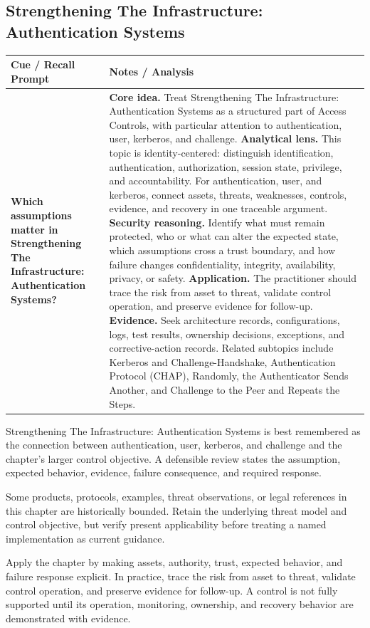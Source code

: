 \documentclass[11pt]{article}
\newcommand{\CornellHeader}{%
\rowcolor{Navy}\color{white}\bfseries Cue / Recall Prompt & \color{white}\bfseries Notes / Analysis\\\hline}
\newcommand{\CornellRow}[2]{%
\cellcolor{CueGray}\RaggedRight\textbf{#1} & \RaggedRight #2\\\hline}
\begin{document}
\subsection*{Strengthening The Infrastructure: Authentication Systems}
\begin{longtable}{>{\RaggedRight\arraybackslash}p{}|>{\RaggedRight\arraybackslash}p{}}
\CornellHeader
\CornellRow{Which assumptions matter in Strengthening The Infrastructure: Authentication Systems?}{\textbf{Core idea.} Treat Strengthening The Infrastructure: Authentication Systems as a structured part of Access Controls, with particular attention to authentication, user, kerberos, and challenge. \textbf{Analytical lens.} This topic is identity-centered: distinguish identification, authentication, authorization, session state, privilege, and accountability. For authentication, user, and kerberos, connect assets, threats, weaknesses, controls, evidence, and recovery in one traceable argument. \textbf{Security reasoning.} Identify what must remain protected, who or what can alter the expected state, which assumptions cross a trust boundary, and how failure changes confidentiality, integrity, availability, privacy, or safety. \textbf{Application.} The practitioner should trace the risk from asset to threat, validate control operation, and preserve evidence for follow-up. \textbf{Evidence.} Seek architecture records, configurations, logs, test results, ownership decisions, exceptions, and corrective-action records. Related subtopics include Kerberos and Challenge-Handshake, Authentication Protocol (CHAP), Randomly, the Authenticator Sends Another, and Challenge to the Peer and Repeats the Steps.}
\end{longtable}
\begin{topicsummary}
Strengthening The Infrastructure: Authentication Systems is best remembered as the connection between authentication, user, kerberos, and challenge and the chapter's larger control objective. A defensible review states the assumption, expected behavior, evidence, failure consequence, and required response.
\end{topicsummary}
\begin{historybox}
Some products, protocols, examples, threat observations, or legal references in this chapter are historically bounded. Retain the underlying threat model and control objective, but verify present applicability before treating a named implementation as current guidance.
\end{historybox}
\begin{defensebox}
Apply the chapter by making assets, authority, trust, expected behavior, and failure response explicit. In practice, trace the risk from asset to threat, validate control operation, and preserve evidence for follow-up. A control is not fully supported until its operation, monitoring, ownership, and recovery behavior are demonstrated with evidence.
\end{defensebox}
\end{document}
